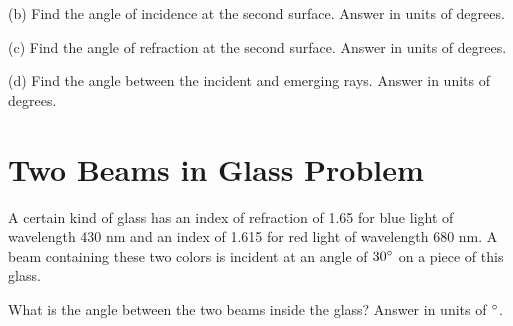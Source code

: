 \documentclass[../physics12.tex]{subfiles}
\begin{document}
(b) Find the angle of incidence at the second surface. Answer in units of degrees.

(c) Find the angle of refraction at the second surface. Answer in units of degrees.

(d) Find the angle between the incident and emerging rays. Answer in units of degrees.

\section{Two Beams in Glass Problem}
A certain kind of glass has an index of refraction of 1.65 for blue light of wavelength 430 nm and an index of 1.615 for red light of wavelength 680 nm. A beam containing these two colors 
is incident at an angle of $30\degree$ on a piece of this glass.

What is the angle between the two beams inside the glass? Answer in units of $\degree$.
\end{document}
